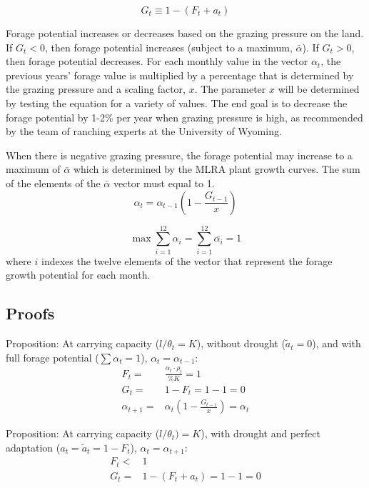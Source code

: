\documentclass[11pt]{article}
\begin{document}
\begin{equation}
G_t \equiv 1 - (F_t + a_t)
\end{equation}

Forage potential increases or decreases based on the grazing pressure on the land. If $G_t < 0$, then forage potential increases (subject to a maximum, $\bar{\alpha}$). If $G_t > 0$, then forage potential decreases. For each monthly value in the vector $\alpha_{t}$, the previous years' forage value is multiplied by a percentage that is determined by the grazing pressure and a scaling factor, $x$. The parameter $x$ will be determined by testing the equation for a variety of values. The end goal is to decrease the forage potential by 1-2\% per year when grazing pressure is high, as recommended by the team of ranching experts at the University of Wyoming. 

When there is negative grazing pressure, the forage potential may increase to a maximum of $\bar{\alpha}$ which is determined by the MLRA plant growth curves. The sum of the elements of the $\bar{\alpha}$ vector must equal to 1.
\begin{equation}
\alpha_t = \alpha_{t-1} \left(1 - \frac{G_{t-1}}{x}\right)
\end{equation}

\begin{equation}
\max \sum_{i=1}^{12} \alpha_{i} = \sum_{i=1}^{12} \bar{\alpha_{i}} = 1 
\end{equation}
where $i$ indexes the twelve elements of the vector that represent the forage growth potential for each month.

\subsection{Proofs}
Proposition: At carrying capacity ($l/\theta_t = K$), without drought ($\tilde{a}_t = 0$), and with full forage potential ($\sum \alpha_t = 1$), $\alpha_t = \alpha_{t-1}$:
\begin{align*}
F_t =& \frac{\alpha_t \cdot \rho_t}{\%K} = 1 \\
G_t =& 1 - F_t = 1-1 = 0 \\
\alpha_{t+1} =& \alpha_{t} \left(1 - \frac{G_{t-1}}{x}\right) = \alpha_{t}
\end{align*}

Proposition:  At carrying capacity ($l/\theta_t) = K$), with drought and perfect adaptation ($a_t = \tilde{a}_t  = 1 - F_t$), $\alpha_t = \alpha_{t+1}$:
\begin{align*}
F_t <& 1 \\
G_t =&  1 - (F_t + a_t) = 1 - 1 = 0
\end{align*}
\end{document}
